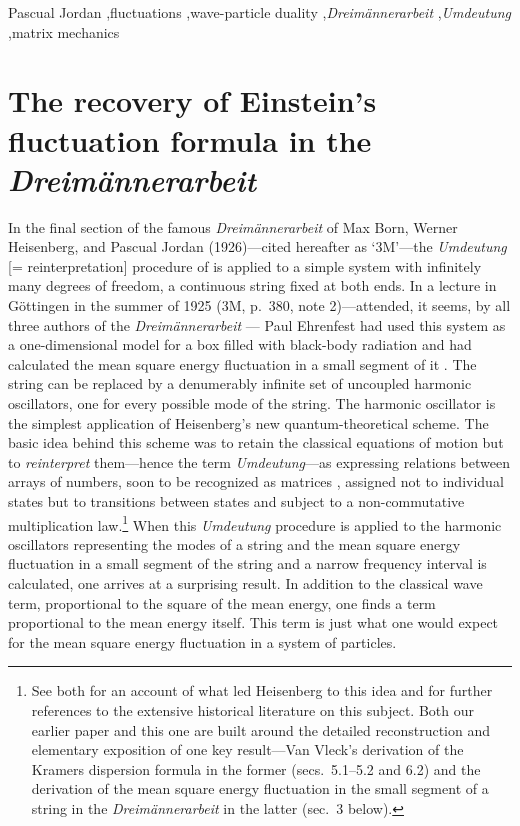\documentclass[12pt]{elsart}
\begin{document}
\begin{frontmatter}
\begin{keyword}
Pascual Jordan \sep fluctuations \sep wave-particle duality \sep {\it Dreim\"annerarbeit} \sep  {\it Umdeutung}  \sep matrix mechanics
\end{keyword}

\end{frontmatter}


\section{The recovery of Einstein's fluctuation formula in the {\it Drei\-m\"anner\-arbeit}}

In the final section of the famous {\it Dreim\"annerarbeit} of Max Born, Werner Heisenberg, and Pascual Jordan (1926)---cited hereafter as `3M'---the {\it Umdeutung} [= reinterpretation] procedure of \citep{Heisenberg 1925} is applied to a simple system with infinitely many degrees of freedom, a continuous string fixed at both ends. In a lecture in G\"ottingen in the summer of 1925 (3M, p.\ 380, note 2)---attended, it seems, by all three authors of the  {\it Dreim\"annerarbeit} --- Paul Ehrenfest had used this system as a one-dimensional model for a box filled with black-body radiation and had calculated the mean square energy fluctuation in a small segment of it \citep{Ehrenfest 1925a}. The string can be replaced by a denumerably infinite set of uncoupled harmonic oscillators, one for every possible mode of the string. The harmonic oscillator is the simplest application of Heisenberg's new quantum-theoretical scheme. The basic idea behind this scheme was to retain the classical equations of motion but to {\it reinterpret} them---hence the term {\it Umdeutung}---as expressing relations between arrays of numbers, soon to be recognized as matrices \citep{Born and Jordan 1925}, assigned not to individual states but to transitions between states and subject to a non-commutative multiplication law.\footnote{See \citep{Duncan and Janssen} both for an account of what led Heisenberg to this idea and for further references to the extensive historical literature on this subject. Both our earlier paper and this one are built around the detailed reconstruction and elementary exposition of one key result---Van Vleck's derivation of the Kramers dispersion formula in the former (secs.\ 5.1--5.2 and 6.2) and the derivation of the mean square energy fluctuation in the small segment of a string in the {\it Dreim\"annerarbeit} in the latter (sec.\ 3 below).} When this {\it Umdeutung} procedure is applied to the harmonic oscillators representing the modes of a string and the mean square energy fluctuation in a small segment of the string and a narrow frequency interval is calculated, one arrives at a surprising result. In addition to the classical wave term, proportional to the square of the mean energy, one finds a term proportional to the mean energy itself. This term is just what one would expect  for the mean square energy fluctuation in a system of particles.
\end{document}
